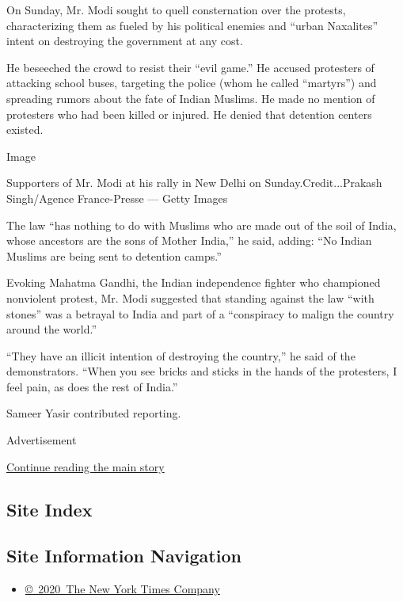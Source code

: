 On Sunday, Mr. Modi sought to quell consternation over the protests,
characterizing them as fueled by his political enemies and ``urban
Naxalites'' intent on destroying the government at any cost.

He beseeched the crowd to resist their ``evil game.'' He accused
protesters of attacking school buses, targeting the police (whom he
called ``martyrs'') and spreading rumors about the fate of Indian
Muslims. He made no mention of protesters who had been killed or
injured. He denied that detention centers existed.

Image

Supporters of Mr. Modi at his rally in New Delhi on
Sunday.Credit...Prakash Singh/Agence France-Presse --- Getty Images

The law ``has nothing to do with Muslims who are made out of the soil of
India, whose ancestors are the sons of Mother India,'' he said, adding:
``No Indian Muslims are being sent to detention camps.''

Evoking Mahatma Gandhi, the Indian independence fighter who championed
nonviolent protest, Mr. Modi suggested that standing against the law
``with stones'' was a betrayal to India and part of a ``conspiracy to
malign the country around the world.''

``They have an illicit intention of destroying the country,'' he said of
the demonstrators. ``When you see bricks and sticks in the hands of the
protesters, I feel pain, as does the rest of India.''

Sameer Yasir contributed reporting.

Advertisement

\protect\hyperlink{after-bottom}{Continue reading the main story}

\hypertarget{site-index}{%
\subsection{Site Index}\label{site-index}}

\hypertarget{site-information-navigation}{%
\subsection{Site Information
Navigation}\label{site-information-navigation}}

\begin{itemize}
\tightlist
\item
  \href{https://help.nytimes.com/hc/en-us/articles/115014792127-Copyright-notice}{©~2020~The
  New York Times Company}
\end{itemize}

